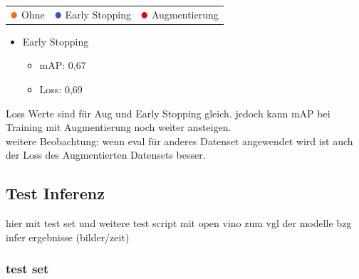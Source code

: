 \begin{figure}[htb]
\begin{minipage}{0.5\textwidth}
  \centering
  \label{plot:mAP}
  \def\svgwidth{0.9\textwidth}
  
\end{minipage}
\begin{minipage}{0.5\textwidth}
  \centering
  \label{plot:Loss}
  \def\svgwidth{0.9\textwidth}
  
\end{minipage}
\end{figure}


\begin{table}[htb]
  \centering
  \begin{tabular}{m{}<{\centering}m{}<{\centering}m{}<{\centering}}
    $\color[RGB]{255,100,30}\medbullet$  Ohne & $\color[RGB]{50,90,200}\medbullet$  Early Stopping & $\color[RGB]{220,10,0}\medbullet$  Augmentierung
  \end{tabular}    
\end{table}


\begin{itemize}
  \item Early Stopping
  \begin{itemize}
    \item mAP: 0,67
    \item Loss: 0,69
  \end{itemize}
\end{itemize}

Loss Werte sind für Aug und Early Stopping gleich. jedoch kann 
mAP bei Training mit Augmentierung noch weiter ansteigen.
\\
weitere Beobachtung: wenn eval für anderes Datenset 
angewendet wird ist auch der Loss des Augmentierten 
Datensets besser.



\subsection{Test Inferenz}
hier mit test set und weitere
test script mit open vino zum vgl der modelle bzg infer ergebnisse (bilder/zeit)
\subsubsection{test set}

